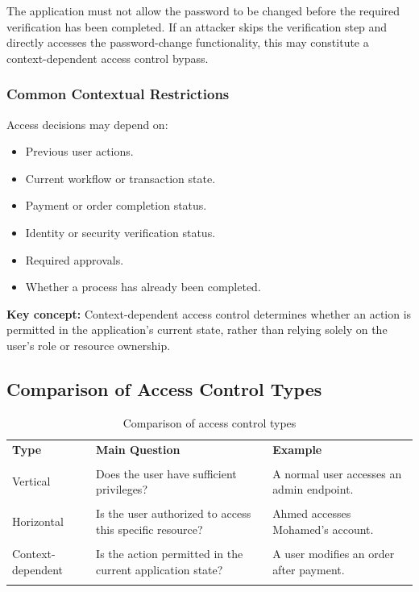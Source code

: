 \documentclass[11pt,a4paper]{article}
\begin{document}
The application must not allow the password to be changed before the required verification has been completed.
If an attacker skips the verification step and directly accesses the password-change functionality, this may constitute a context-dependent access control bypass.

\subsubsection{Common Contextual Restrictions}

Access decisions may depend on:
\begin{itemize}
    \item Previous user actions.
    \item Current workflow or transaction state.
    \item Payment or order completion status.
    \item Identity or security verification status.
    \item Required approvals.
    \item Whether a process has already been completed.
\end{itemize}

\textbf{Key concept:} Context-dependent access control determines whether an action is permitted in the application's current state, rather than relying solely on the user's role or resource ownership.

\subsection{Comparison of Access Control Types}

\begin{table}[htbp]
    \centering
    \begin{tabular}{|p{}|p{}|p{}|}
        \hline
        \textbf{Type}     & \textbf{Main Question}                                    & \textbf{Example}                          \\\\
        \hline
        Vertical          & Does the user have sufficient privileges?                 & A normal user accesses an admin endpoint. \\\\
        \hline
        Horizontal        & Is the user authorized to access this specific resource?  & Ahmed accesses Mohamed's account.         \\\\
        \hline
        Context-dependent & Is the action permitted in the current application state? & A user modifies an order after payment.   \\\\
        \hline
    \end{tabular}

    \caption{Comparison of access control types}
    \label{tab:access-control-types}
\end{table}
\end{document}
